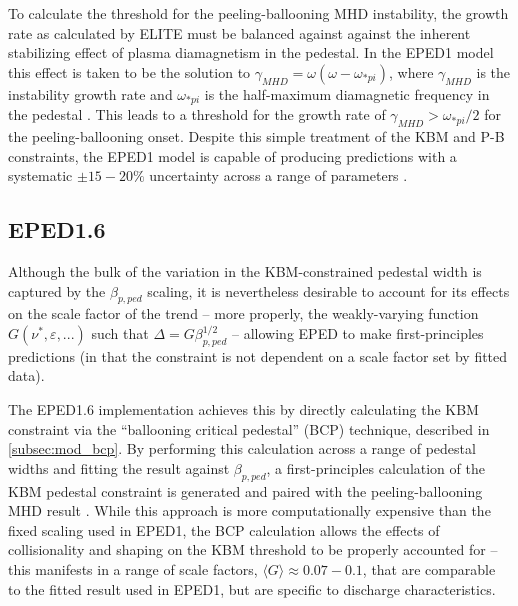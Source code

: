 To calculate the threshold for the peeling-ballooning MHD instability, the growth rate as calculated by ELITE must be balanced against against the inherent stabilizing effect of plasma diamagnetism in the pedestal.  In the EPED1 model this effect is taken to be the solution to $\gamma_{MHD} = \omega (\omega - \omega_{*pi})$, where $\gamma_{MHD}$ is the instability growth rate and $\omega_{*pi}$ is the half-maximum diamagnetic frequency in the pedestal \cite{Snyder2009}.  This leads to a threshold for the growth rate of $\gamma_{MHD} > \omega_{*pi}/2$ for the peeling-ballooning onset.  Despite this simple treatment of the KBM and P-B constraints, the EPED1 model is capable of producing predictions with a systematic $\pm 15-20\%$ uncertainty across a range of parameters \cite{Snyder2009,Snyder2010}.

\subsection{EPED1.6}\label{subsec:mod_eped16}

Although the bulk of the variation in the KBM-constrained pedestal width is captured by the $\beta_{p,ped}$ scaling, it is nevertheless desirable to account for its effects on the scale factor of the trend -- more properly, the weakly-varying function $G(\nu^*,\varepsilon,...)$ such that $\Delta = G \beta_{p,ped}^{1/2}$ -- allowing EPED to make first-principles predictions (in that the constraint is not dependent on a scale factor set by fitted data).  

The EPED1.6 implementation \cite{Snyder2010,Snyder2011} achieves this by directly calculating the KBM constraint via the ``ballooning critical pedestal'' (BCP) technique, described in \cref{subsec:mod_bcp}.    By performing this calculation across a range of pedestal widths and fitting the result against $\beta_{p,ped}$, a first-principles calculation of the KBM pedestal constraint is generated and paired with the peeling-ballooning MHD result \cite{Snyder2011}.  While this approach is more computationally expensive than the fixed scaling used in EPED1, the BCP calculation allows the effects of collisionality and shaping on the KBM threshold to be properly accounted for -- this manifests in a range of scale factors, $\langle G \rangle \approx 0.07-0.1$, that are comparable to the fitted result used in EPED1, but are specific to discharge characteristics.


